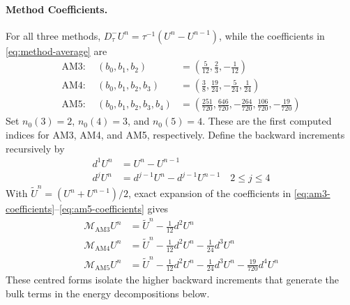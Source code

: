 \documentclass[11pt]{article}
\begin{document}
\paragraph{Method Coefficients.}
For all three methods,
\(D_{\tau}^{-}U^n=\tau^{-1}(U^n-U^{n-1})\), while the coefficients in
\eqref{eq:method-average} are
\begin{align}
\mathrm{AM3}:\quad(b_0,b_1,b_2)
&=\left(\frac5{12},\frac23,-\frac1{12}\right) \label{eq:am3-coefficients}\\
\mathrm{AM4}:\quad(b_0,b_1,b_2,b_3)
&=\left(\frac38,\frac{19}{24},-\frac5{24},\frac1{24}\right) \label{eq:am4-coefficients}\\
\mathrm{AM5}:\quad(b_0,b_1,b_2,b_3,b_4)
&=\left(\frac{251}{720},\frac{646}{720},-\frac{264}{720},
\frac{106}{720},-\frac{19}{720}\right) \label{eq:am5-coefficients}
\end{align}
Set \(n_0(3)=2\), \(n_0(4)=3\), and \(n_0(5)=4\). These are the first
computed indices for AM3, AM4, and AM5, respectively.
Define the backward increments recursively by
\begin{align}
d^1U^n&=U^n-U^{n-1} \label{eq:first-backward-increment}\\
d^jU^n&=d^{j-1}U^n-d^{j-1}U^{n-1}
\quad 2\le j\le4 \label{eq:higher-backward-increments}
\end{align}
With \(\widetilde U^n=(U^n+U^{n-1})/2\), exact expansion of the coefficients
in \eqref{eq:am3-coefficients}--\eqref{eq:am5-coefficients} gives
\begin{align}
\mathcal M_{\mathrm{AM3}}U^n
&=\widetilde U^n-\frac1{12}d^2U^n \label{eq:am3-increment-average}\\
\mathcal M_{\mathrm{AM4}}U^n
&=\widetilde U^n-\frac1{12}d^2U^n-\frac1{24}d^3U^n \label{eq:am4-increment-average}\\
\mathcal M_{\mathrm{AM5}}U^n
&=\widetilde U^n-\frac1{12}d^2U^n-\frac1{24}d^3U^n
-\frac{19}{720}d^4U^n \label{eq:am5-increment-average}
\end{align}
These centred forms isolate the higher backward increments that generate the
bulk terms in the energy decompositions below.

\end{document}
